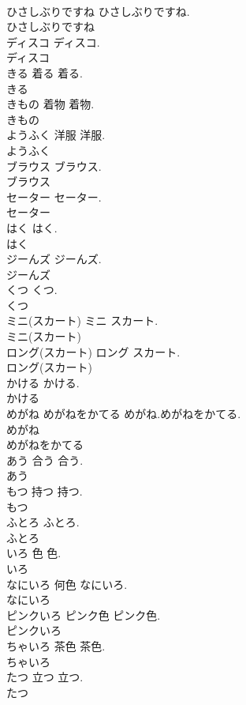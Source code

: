 \documentclass[8pt]{extreport}
\begin{document}
\begin{CJK}{UTF8}{min}
\\	ひさしぶりですね		ひさしぶりですね.	
\\	ひさしぶりですね
\\	ディスコ		ディスコ.	
\\	ディスコ
\\	きる	着る	着る.	
\\	きる
\\	きもの	着物	着物.	
\\	きもの
\\	ようふく	洋服	洋服.	
\\	ようふく
\\	ブラウス		ブラウス.	
\\	ブラウス
\\	セーター		セーター.	
\\	セーター
\\	はく		はく.	
\\	はく
\\	ジーんズ		ジーんズ.	
\\	ジーんズ
\\	くつ		くつ.	
\\	くつ
\\	ミニ(スカート)		ミニ スカート.	
\\	ミニ(スカート)
\\	ロング(スカート)		ロング スカート.	
\\	ロング(スカート)
\\	かける		かける.	
\\	かける
\\	めがね めがねをかてる		めがね.めがねをかてる.	
\\	めがね
\\	めがねをかてる
\\	あう	合う	合う.	
\\	あう
\\	もつ	持つ	持つ.	
\\	もつ
\\	ふとろ		ふとろ.	
\\	ふとろ
\\	いろ	色	色.	
\\	いろ
\\	なにいろ	何色	なにいろ.	
\\	なにいろ
\\	ピンクいろ	ピンク色	ピンク色.	
\\	ピンクいろ
\\	ちゃいろ	茶色	茶色.	
\\	ちゃいろ
\\	たつ	立つ	立つ.	
\\	たつ

\end{CJK}
\end{document}
